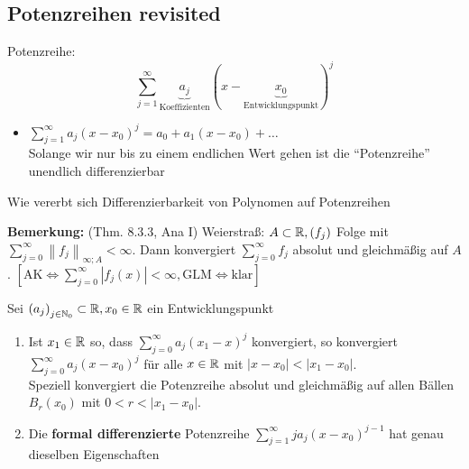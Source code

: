 \subsection{Potenzreihen revisited}
Potenzreihe:
\[
	\sum_{j=1}^{\infty} \underbrace{a_j}_{\text{Koeffizienten} } \left( x - \underbrace{ x_0 }_{\text{Entwicklungspunkt} } \right)^j 
\]

\begin{itemize}
	\item $ \sum_{j=1}^{\infty} a_j (x - x_0)^j = a_0 + a_1 (x - x_0) + \dotsc $\\
		Solange wir nur bis zu einem endlichen Wert gehen ist die ``Potenzreihe'' unendlich differenzierbar
\end{itemize}
Wie vererbt sich Differenzierbarkeit von Polynomen auf Potenzreihen

\textbf{Bemerkung:} (Thm. 8.3.3, Ana I) Weierstraß: $ A \subset \mathbb{R} , (f_j) $ Folge mit $ \sum_{j=0}^{\infty} \left\| f_j \right\| _{\infty;A} < \infty $. Dann konvergiert $ \sum_{j=0}^{\infty} f_j $ absolut und gleichmäßig auf $ A $. $ \left[ \text{AK} \iff \sum_{j=0}^{\infty} \left| f_j(x) \right| < \infty, \text{GLM} \iff \text{klar}  \right] $ 

\begin{subtheorem}
	Sei $ \left( a_j \right) _{j \in \mathbb{N} _0} \subset \mathbb{R} , x_0 \in \mathbb{R}  $ ein Entwicklungspunkt
	\begin{enumerate}[label=(\roman*)]
		\item Ist $ x_1 \in \mathbb{R}  $ so, dass $ \sum_{j=0}^{\infty} a_j (x_1 - x)^j $ konvergiert, so konvergiert $ \sum_{j=0}^{\infty} a_j ( x - x_0 )^j $ für alle $ x \in \mathbb{R}  $ mit $ \left| x - x_0 \right| < \left| x_1 - x_0 \right|  $.\\
			Speziell konvergiert die Potenzreihe absolut und gleichmäßig auf allen Bällen $ B_{r}(x_0)  $ mit $ 0 < r < \left| x_1 - x_0 \right|  $.
		\item Die \textbf{formal differenzierte} Potenzreihe $ \sum_{j=1}^{\infty} j a_j (x - x_0)^{j-1} $ hat genau dieselben Eigenschaften
	\end{enumerate}
\end{subtheorem}

